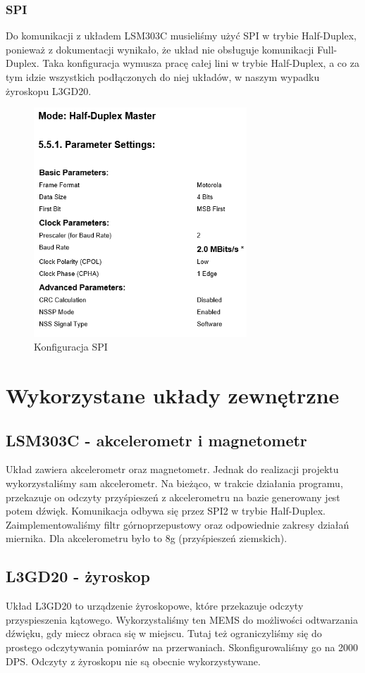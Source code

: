 \documentclass[10pt, a4paper]{article}
\begin{document}
\subsubsection{SPI}
Do komunikacji z układem LSM303C musieliśmy użyć SPI w trybie Half-Duplex, ponieważ z dokumentacji wynikało, że układ nie obsługuje komunikacji Full-Duplex. Taka konfiguracja wymusza pracę całej lini w trybie Half-Duplex, a co za tym idzie wszystkich podłączonych do niej układów, w naszym wypadku żyroskopu L3GD20.
\begin{figure}[H]
	\centering
	\includegraphics[width=80mm]{c1.png}
	\caption{Konfiguracja SPI}
	\end{figure}




	

\section{Wykorzystane układy zewnętrzne}
\subsection{LSM303C - akcelerometr i magnetometr}
Układ zawiera akcelerometr oraz magnetometr. Jednak do realizacji projektu wykorzystaliśmy sam akcelerometr. Na bieżąco, w trakcie działania programu, przekazuje on odczyty przyśpieszeń z akcelerometru na bazie generowany jest potem dźwięk. Komunikacja odbywa się przez SPI2 w trybie Half-Duplex. Zaimplementowaliśmy filtr górnoprzepustowy oraz odpowiednie zakresy działań miernika. Dla akcelerometru było to 8g (przyśpieszeń ziemskich).




\subsection{L3GD20 - żyroskop}
Układ L3GD20 to urządzenie żyroskopowe, które przekazuje odczyty przyspieszenia kątowego. Wykorzystaliśmy ten MEMS do możliwości odtwarzania dźwięku, gdy miecz obraca się w miejscu. Tutaj też ograniczyliśmy się do prostego odczytywania pomiarów na przerwaniach. Skonfigurowaliśmy go na 2000 DPS. Odczyty z żyroskopu nie są obecnie wykorzystywane.
\end{document}
